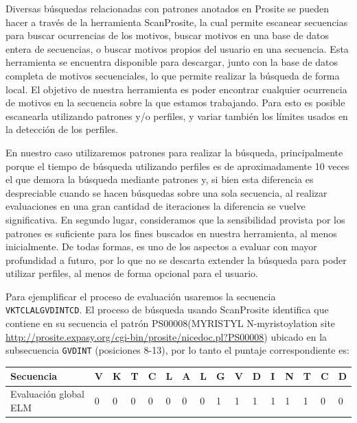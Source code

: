 Diversas búsquedas relacionadas con patrones anotados en Prosite se pueden hacer a través de la herramienta ScanProsite\cite{de2006scanprosite,scanprositeWeb}, 
la cual permite escanear secuencias para buscar ocurrencias de los motivos, buscar motivos en una base de datos entera de secuencias, o buscar motivos propios del usuario en una secuencia.
Esta herramienta se encuentra disponible para descargar, junto con la base de datos completa de motivos secuenciales, lo que permite realizar la búsqueda de forma local.
El objetivo de nuestra herramienta es poder encontrar cualquier ocurrencia de motivos en la secuencia sobre la que estamos trabajando. 
Para esto es posible escanearla utilizando patrones y/o perfiles, y variar también los límites usados en la detección de los perfiles. 

En nuestro caso utilizaremos patrones para realizar la búsqueda, principalmente porque el tiempo de búsqueda utilizando perfiles es de aproximadamente 10 veces el que demora la búsqueda mediante patrones 
y, si bien esta diferencia es despreciable cuando se hacen búsquedas sobre una sola secuencia, al realizar evaluaciones en una gran cantidad de iteraciones la diferencia se vuelve significativa.
En segundo lugar, consideramos que la sensibilidad provista por los patrones es suficiente para los fines buscados en nuestra herramienta, al menos inicialmente.
De todas formas, es uno de los aspectos a evaluar con mayor profundidad a futuro, por lo que no se descarta extender la búsqueda para poder utilizar perfiles, al menos de forma opcional para el usuario. 

Para ejemplificar el proceso de evaluación usaremos la secuencia \texttt{VKTCLALGVDINTCD}. El proceso de búsqueda usando ScanProsite identifica que contiene en su secuencia el patrón PS00008(MYRISTYL N-myristoylation site 
\url{http://prosite.expasy.org/cgi-bin/prosite/nicedoc.pl?PS00008}) ubicado en la subsecuencia \texttt{GVDINT} (posiciones 8-13), por lo tanto el puntaje correspondiente es:

\vspace{0.5cm}
\begin{tabular}{llllllllllllllll} 
\hline
Secuencia & \textbf{V} & \textbf{K} & \textbf{T} & \textbf{C} & \textbf{L} & \textbf{A} & \textbf{L} & \textbf{G} & \textbf{V} & \textbf{D} & \textbf{I} & \textbf{N} & \textbf{T} & \textbf{C} & \textbf{D}\\ \hline
Evaluación global ELM & 0 & 0 & 0 & 0 & 0 & 0 & 0 & 1 & 1 & 1 & 1 & 1 & 1 & 0 & 0 \\ \hline
\end{tabular}














